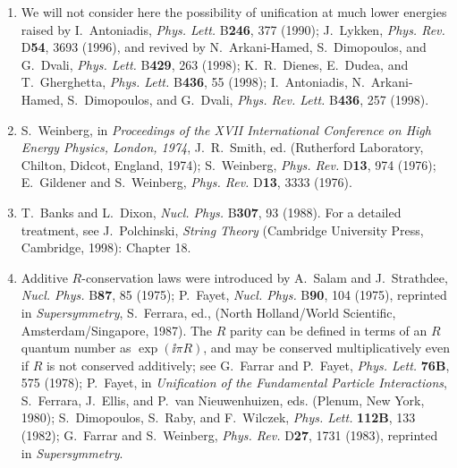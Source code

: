 
\begin{enumerate}
  \item {}\label{ch28-ref-1}
  We will not consider here the possibility of unification at much
  lower energies raised by I.~Antoniadis, \textit{Phys. Lett.}
  B\textbf{246}, 377 (1990); J.~Lykken, \textit{Phys. Rev.}
  D\textbf{54}, 3693 (1996), and revived by N.~Arkani-Hamed,
  S.~Dimopoulos, and G.~Dvali, \textit{Phys. Lett.} B\textbf{429}, 263
  (1998); K.~R.~Dienes, E.~Dudea, and T.~Gherghetta,
  \textit{Phys. Lett.} B\textbf{436}, 55 (1998); I.~Antoniadis,
  N.~Arkani-Hamed, S.~Dimopoulos, and G.~Dvali,
  \textit{Phys. Rev. Lett.} B\textbf{436}, 257 (1998).

  \item[1a.] \label{ch28-ref-1a}
  S.~Weinberg, in \textit{Proceedings of the XVII International
  Conference on High Energy Physics, London, 1974}, J.~R.~Smith, ed.
  (Rutherford Laboratory, Chilton, Didcot, England, 1974); S.~Weinberg,
  \textit{Phys. Rev.} D\textbf{13}, 974 (1976); E.~Gildener and
  S.~Weinberg, \textit{Phys. Rev.} D\textbf{13}, 3333 (1976).

  \item[1b.] \label{ch28-ref-1b}
  T.~Banks and L.~Dixon, \textit{Nucl. Phys.} B\textbf{307}, 93
  (1988). For a detailed treatment, see J.~Polchinski,
  \textit{String Theory} (Cambridge University Press, Cambridge,
  1998): Chapter 18.

  \item {}\label{ch28-ref-2}
  Additive $R$-conservation laws were introduced by A.~Salam and
  J.~Strathdee, \textit{Nucl. Phys.} B\textbf{87}, 85 (1975);
  P.~Fayet, \textit{Nucl. Phys.} B\textbf{90}, 104 (1975), reprinted
  in \textit{Supersymmetry}, S.~Ferrara, ed., (North Holland/World
  Scientific, Amsterdam/Singapore, 1987). The $R$ parity can be
  defined in terms of an $R$ quantum number as $\exp(\ii\pi R)$, and may
  be conserved multiplicatively even if $R$ is not conserved
  additively; see G.~Farrar and P.~Fayet, \textit{Phys. Lett.}
  \textbf{76B}, 575 (1978); P.~Fayet, in \textit{Unification of the
  Fundamental Particle Interactions}, S.~Ferrara, J.~Ellis, and
  P.~van Nieuwenhuizen, eds. (Plenum, New York, 1980); S.~Dimopoulos,
  S.~Raby, and F.~Wilczek, \textit{Phys. Lett.} \textbf{112B}, 133
  (1982); G.~Farrar and S.~Weinberg, \textit{Phys. Rev.}
  D\textbf{27}, 1731 (1983), reprinted in \textit{Supersymmetry}.


\end{enumerate}
